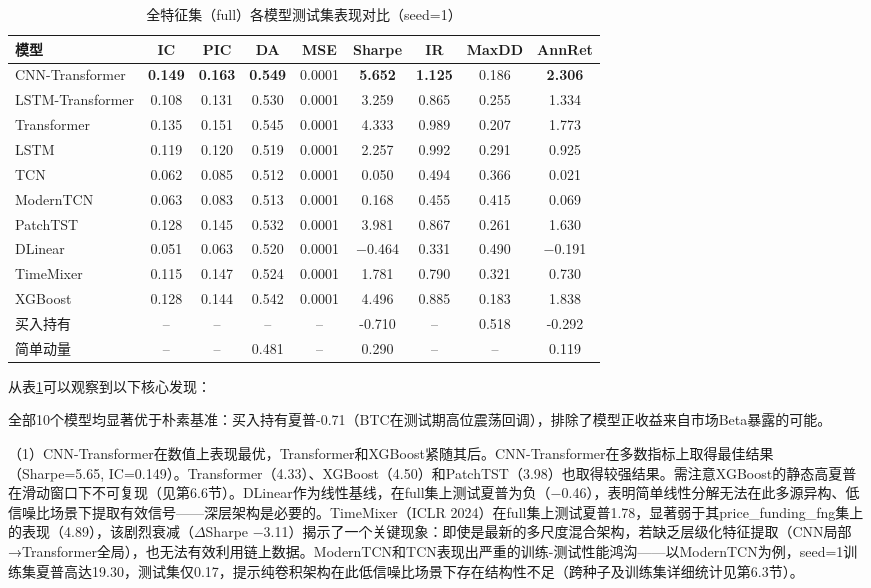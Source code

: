 \documentclass[12pt,a4paper]{ctexart}
\begin{document}
\begin{table}[H]
\centering
\footnotesize
\setlength{\tabcolsep}{2pt}
\caption{全特征集（full）各模型测试集表现对比（seed=1）}
\label{tab:full_results}
\begin{tabular}{lcccccccc}
\toprule
模型 & IC & PIC & DA & MSE & Sharpe & IR & MaxDD & AnnRet \\
\midrule
CNN-Transformer & \bfseries0.149 & \bfseries0.163 & \bfseries0.549 & 0.0001 & \bfseries5.652 & \bfseries1.125 & 0.186 & \bfseries2.306 \\
LSTM-Transformer & 0.108 & 0.131 & 0.530 & 0.0001 & 3.259 & 0.865 & 0.255 & 1.334 \\
Transformer & 0.135 & 0.151 & 0.545 & 0.0001 & 4.333 & 0.989 & 0.207 & 1.773 \\
LSTM & 0.119 & 0.120 & 0.519 & 0.0001 & 2.257 & 0.992 & 0.291 & 0.925 \\
TCN & 0.062 & 0.085 & 0.512 & 0.0001 & 0.050 & 0.494 & 0.366 & 0.021 \\
ModernTCN & 0.063 & 0.083 & 0.513 & 0.0001 & 0.168 & 0.455 & 0.415 & 0.069 \\
PatchTST & 0.128 & 0.145 & 0.532 & 0.0001 & 3.981 & 0.867 & 0.261 & 1.630 \\
DLinear & 0.051 & 0.063 & 0.520 & 0.0001 & $-$0.464 & 0.331 & 0.490 & $-$0.191 \\
TimeMixer & 0.115 & 0.147 & 0.524 & 0.0001 & 1.781 & 0.790 & 0.321 & 0.730 \\
XGBoost & 0.128 & 0.144 & 0.542 & 0.0001 & 4.496 & 0.885 & 0.183 & 1.838 \\
\midrule
买入持有 & -- & -- & -- & -- & -0.710 & -- & 0.518 & -0.292 \\
简单动量 & -- & -- & 0.481 & -- & 0.290 & -- & -- & 0.119 \\
\bottomrule
\end{tabular}
\end{table}

从表\ref{tab:full_results}可以观察到以下核心发现：

全部10个模型均显著优于朴素基准：买入持有夏普-0.71（BTC在测试期高位震荡回调），排除了模型正收益来自市场Beta暴露的可能。

（1）CNN-Transformer在数值上表现最优，Transformer和XGBoost紧随其后。CNN-Transformer在多数指标上取得最佳结果（Sharpe=5.65, IC=0.149）。Transformer（4.33）、XGBoost（4.50）和PatchTST（3.98）也取得较强结果。需注意XGBoost的静态高夏普在滑动窗口下不可复现（见第6.6节）。DLinear作为线性基线，在full集上测试夏普为负（$-$0.46），表明简单线性分解无法在此多源异构、低信噪比场景下提取有效信号——深层架构是必要的。TimeMixer（ICLR 2024）在full集上测试夏普1.78，显著弱于其price\_funding\_fng集上的表现（4.89），该剧烈衰减（$\Delta$Sharpe $-$3.11）揭示了一个关键现象：即使是最新的多尺度混合架构，若缺乏层级化特征提取（CNN局部→Transformer全局），也无法有效利用链上数据。ModernTCN和TCN表现出严重的训练-测试性能鸿沟——以ModernTCN为例，seed=1训练集夏普高达19.30，测试集仅0.17，提示纯卷积架构在此低信噪比场景下存在结构性不足（跨种子及训练集详细统计见第6.3节）。
\end{document}
